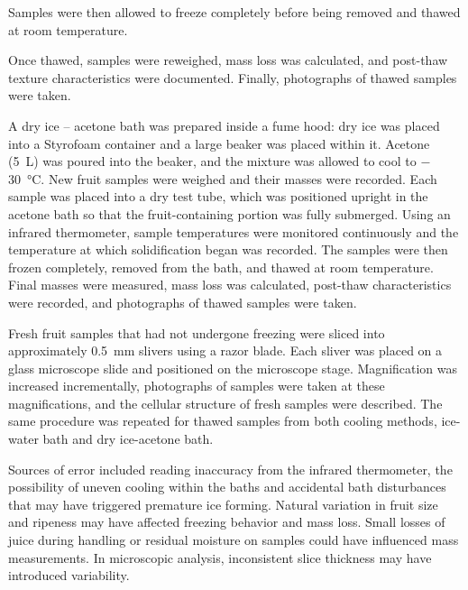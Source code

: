 \documentclass[12pt, a4paper]{article}
\begin{document}

Samples were then allowed to freeze completely before being removed and
thawed at room temperature.


Once thawed, samples were reweighed, mass loss was calculated, and
post-thaw texture characteristics were documented. Finally, photographs
of thawed samples were taken.

A dry ice -- acetone bath was prepared inside a fume hood: dry ice was
placed into a Styrofoam container and a large beaker was placed within
it. Acetone (5~L) was poured into the beaker, and the mixture was
allowed to cool to $-$30~°C. New fruit samples were weighed and their
masses were recorded. Each sample was placed into a dry test tube, which
was positioned upright in the acetone bath so that the fruit-containing
portion was fully submerged. Using an infrared thermometer, sample
temperatures were monitored continuously and the temperature at which
solidification began was recorded. The samples were then frozen
completely, removed from the bath, and thawed at room temperature. Final
masses were measured, mass loss was calculated, post-thaw characteristics
were recorded, and photographs of thawed samples were taken.

Fresh fruit samples that had not undergone freezing were sliced into
approximately 0.5~mm slivers using a razor blade. Each sliver was placed
on a glass microscope slide and positioned on the microscope stage.
Magnification was increased incrementally, photographs of samples were
taken at these magnifications, and the cellular structure of fresh
samples were described. The same procedure was repeated for thawed
samples from both cooling methods, ice-water bath and dry ice-acetone
bath.

Sources of error included reading inaccuracy from the infrared
thermometer, the possibility of uneven cooling within the baths and
accidental bath disturbances that may have triggered premature ice
forming. Natural variation in fruit size and ripeness may have affected
freezing behavior and mass loss. Small losses of juice during handling
or residual moisture on samples could have influenced mass measurements.
In microscopic analysis, inconsistent slice thickness may have introduced
variability.
\end{document}
